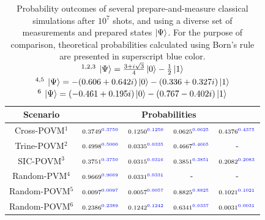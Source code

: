\begin{table}[h!]
\centering
{\renewcommand{\arraystretch}{1.5}%
\begin{tabular}{ccccc} 
 \toprule
 Scenario & \multicolumn{4}{c}{Probabilities}  \\ \hline
 {Cross-POVM$^1$}   & $\scriptstyle0.3749^{\textcolor[rgb]{0,0,1}{0.3750}}$ 
                    & $\scriptstyle0.1250^{\textcolor[rgb]{0,0,1}{0.1250}}$ 
                    & $\scriptstyle0.0625^{\textcolor[rgb]{0,0,1}{0.0625}}$ 
                    & $\scriptstyle0.4376^{\textcolor[rgb]{0,0,1}{0.4375}}$ \\ 
 {Trine-POVM$^2$}   & $\scriptstyle0.4998^{\textcolor[rgb]{0,0,1}{0.5000}}$ 
                    & $\scriptstyle0.0335^{\textcolor[rgb]{0,0,1}{0.0335}}$ 
                    & $\scriptstyle0.4667^{\textcolor[rgb]{0,0,1}{0.4665}}$ 
                    & -  \\ 
 {SIC-POVM$^3$}     & $\scriptstyle0.3751^{\textcolor[rgb]{0,0,1}{0.3750}}$ 
                    & $\scriptstyle0.0315^{\textcolor[rgb]{0,0,1}{0.0316}}$ 
                    & $\scriptstyle0.3851^{\textcolor[rgb]{0,0,1}{0.3851}}$ 
                    & $\scriptstyle0.2082^{\textcolor[rgb]{0,0,1}{0.2083}}$ \\
 {Random-PVM$^4$}   & $\scriptstyle0.9669^{\textcolor[rgb]{0,0,1}{0.9669}}$ 
                    & $\scriptstyle0.0331^{\textcolor[rgb]{0,0,1}{0.0331}}$ 
                    & - 
                    & - \\ 
 {Random-POVM$^5$}  & $\scriptstyle0.0097^{\textcolor[rgb]{0,0,1}{0.0097}}$ 
                    & $\scriptstyle0.0057^{\textcolor[rgb]{0,0,1}{0.0057}}$ 
                    & $\scriptstyle0.8825^{\textcolor[rgb]{0,0,1}{0.8825}}$ 
                    & $\scriptstyle0.1021^{\textcolor[rgb]{0,0,1}{0.1021}}$ \\ 
 {Random-POVM$^6$}  & $\scriptstyle0.2386^{\textcolor[rgb]{0,0,1}{0.2389}}$ 
                    & $\scriptstyle0.1242^{\textcolor[rgb]{0,0,1}{0.1242}}$ 
                    & $\scriptstyle0.6341^{\textcolor[rgb]{0,0,1}{0.6337}}$ 
                    & $\scriptstyle0.0031^{\textcolor[rgb]{0,0,1}{0.0031}}$\\
 \bottomrule
\end{tabular}}
\caption{Probability outcomes of several prepare-and-measure classical simulations after $10^7$ shots, and using a diverse set of measurements and prepared states $\ket{\Psi}$. For the purpose of comparison, theoretical probabilities calculated using Born's rule are presented in superscript blue color. \\$^{1,2,3}\:\ket{\Psi}=\frac{3 + i \sqrt{3}}{4} \ket{0} - \frac{1}{2} \ket{1}$\\
$^{4,5}\:\ket{\Psi}= - (0.606 + 0.642 i) \ket{0} - (0.336 + 0.327i) \ket{1}$\\
$^{6}\:\ket{\Psi}= (-0.461 + 0.195i) \ket{0} - (0.767 - 0.402i) \ket{1}$}
\label{table:classical_results_pm}
\end{table}

